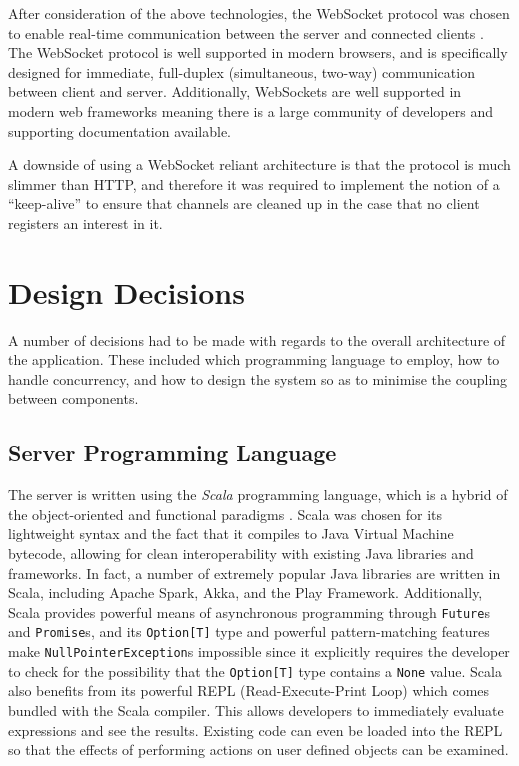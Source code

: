 \documentclass{l4proj}
\newcommand{\code}[1]{\texttt{#1}}
\begin{document}
       After consideration of the above technologies, the WebSocket protocol was chosen to enable real-time communication between the server and connected clients \cite{websocket}. The WebSocket protocol is well supported in modern browsers, and is specifically designed for immediate, full-duplex (simultaneous, two-way) communication between client and server. Additionally, WebSockets are well supported in modern web frameworks meaning there is a large community of developers  and supporting documentation available.
          
        A downside of using a WebSocket reliant architecture is that the protocol is much slimmer than HTTP, and therefore it was required to implement the notion of a ``keep-alive'' to ensure that channels are cleaned up in the case that no client registers an interest in it.


    \section{Design Decisions}

    A number of decisions had to be made with regards to the overall architecture of the application. These included which programming language to employ, how to handle concurrency, and how to design the system so as to minimise the coupling between components.

    \subsection{Server Programming Language}
            The server is written using the \textit{Scala} programming language, which is a hybrid of the object-oriented and functional paradigms \cite{scala}. Scala was chosen for its lightweight syntax and the fact that it compiles to Java Virtual Machine bytecode, allowing for clean interoperability with existing Java libraries and frameworks. In fact, a number of extremely popular Java libraries are written in Scala, including Apache Spark, Akka, and the Play Framework. Additionally, Scala provides powerful means of asynchronous programming through \code{Future}s and \code{Promise}s, and its \code{Option[T]} type and powerful pattern-matching features make \code{NullPointerException}s impossible since it explicitly requires the developer to check for the possibility that the \code{Option[T]} type contains a \code{None} value. Scala also benefits from its powerful REPL (Read-Execute-Print Loop) which comes bundled with the Scala compiler. This allows developers to immediately evaluate expressions and see the results. Existing code can even be loaded into the REPL so that the effects of performing actions on user defined objects can be examined.
            
\end{document}
